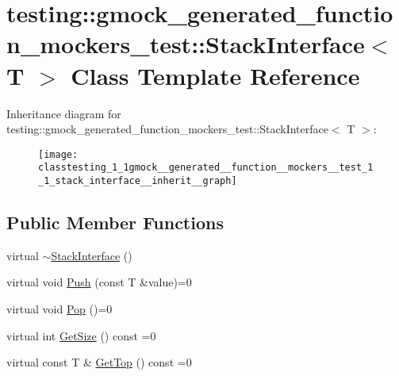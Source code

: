 \hypertarget{classtesting_1_1gmock__generated__function__mockers__test_1_1_stack_interface}{}\section{testing\+:\+:gmock\+\_\+generated\+\_\+function\+\_\+mockers\+\_\+test\+:\+:Stack\+Interface$<$ T $>$ Class Template Reference}
\label{classtesting_1_1gmock__generated__function__mockers__test_1_1_stack_interface}


Inheritance diagram for testing\+:\+:gmock\+\_\+generated\+\_\+function\+\_\+mockers\+\_\+test\+:\+:Stack\+Interface$<$ T $>$\+:
\nopagebreak
\begin{figure}[H]
\begin{center}
\leavevmode
\texttt{[image: classtesting\_1\_1gmock\_\_generated\_\_function\_\_mockers\_\_test\_1\_1\_stack\_interface\_\_inherit\_\_graph]}
\end{center}
\end{figure}
\subsection*{Public Member Functions}
\begin{DoxyCompactItemize}
\item 
virtual \hyperlink{classtesting_1_1gmock__generated__function__mockers__test_1_1_stack_interface_a87b83db3e9cb1c986d6b0649b37cfa7c}{$\sim$\+Stack\+Interface} ()
\item 
virtual void \hyperlink{classtesting_1_1gmock__generated__function__mockers__test_1_1_stack_interface_a49448f6195021fee947d37b80b6e5d30}{Push} (const T \&value)=0
\item 
virtual void \hyperlink{classtesting_1_1gmock__generated__function__mockers__test_1_1_stack_interface_a1a6646d1d9febe90c607b9b3e4539b67}{Pop} ()=0
\item 
virtual int \hyperlink{classtesting_1_1gmock__generated__function__mockers__test_1_1_stack_interface_a537ec8647a2333f50e5f923a85b90eba}{Get\+Size} () const =0
\item 
virtual const T \& \hyperlink{classtesting_1_1gmock__generated__function__mockers__test_1_1_stack_interface_af36e32b9ae568100363466d1ebf95364}{Get\+Top} () const =0
\end{DoxyCompactItemize}


